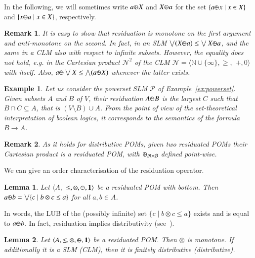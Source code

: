 \documentclass[a4paper]{elsarticle}
\newtheorem{example}{Example}
\newtheorem{remark}{Remark}
\newtheorem{lemma}{Lemma}
\newcommand{\monop}{\otimes}
\newcommand{\1}{\mathbf{1}}
\def\odiv{{ \ominus\hspace{-8pt}:}\;}
\begin{document}
In the following, we will sometimes write $a \odiv X$ and $X \odiv a$
for the set  $\{a \odiv x \mid x \in X\}$ and  $\{x \odiv a \mid x \in X\}$,
respectively.

\begin{remark}\label{natural}
	It is easy to show that residuation is monotone on the first argument and
	anti-monotone on the second. In fact, in an SLM 
	$\bigvee (X \odiv a) \leq \bigvee X \odiv a$,
	and the same in a CLM also with respect to infinite subsets.
	However, the equality does not hold,
	e.g. in the Cartesian product $\mathcal{N}^2$ of the CLM  
	$\mathcal{N} = \langle \mathbb{N} \cup \{\infty\}, \geq,$ $+, 0 \rangle$ with itself.
	Also, 
	$a \odiv \bigvee X \leq \bigwedge (a \odiv X)$
	whenever the latter exists. %
\end{remark}

\begin{example}
Let us consider the powerset SLM $\mathcal{P}$ of Example~\ref{ex:powerset}. 
Given subsets $A$ and $B$ of $V$, their residuation $A \odiv B$ 
is the largest $C$ such that $B \cap C \subseteq A$, that is $(V \setminus B) \cup A$. From the point of view
of the set-theoretical interpretation of boolean logics, it corresponds to the semantics of the formula $B \rightarrow A$.
\end{example}

\begin{remark}
	\label{remarkC}
	As it holds for distributive POMs, given two residuated POMs their Cartesian product
	is a residuated POM, with $\odiv_{\mathcal{A} \times \mathcal{B}}$ defined point-wise.
\end{remark}

We can give an order characterisation of the residuation operator.

\begin{lemma}\label{rclm1}
	Let $\langle A,$ $\leq, \otimes,  \odiv, \1 \rangle$ be a residuated POM with bottom.
	Then $a \odiv b = \bigvee \{c \mid b \otimes c \leq a\}$ for all $a, b \in A$.
\end{lemma}

In words, the LUB of the (possibly infinite) set 
$\{c \mid b \otimes c \leq a\}$ exists and is equal to $a \odiv b$.
%
In fact, residuation implies distributivity (see~\cite[Lemma 2.2]{ipl}).

\begin{lemma}\label{rclm2}
	Let $\langle A, \leq, \monop, \odiv, \1 \rangle$ be a residuated POM. 
	Then $\monop$ is monotone.
	If additionally it is a SLM (CLM), then it is finitely distributive
	(distributive).
\end{lemma}
\end{document}

